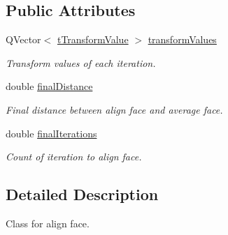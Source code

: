 \subsection*{Public Attributes}
\begin{DoxyCompactItemize}
\item 
\hypertarget{class_face_aligner_a7688c60fe7dde82bf3c6d1e41ec024f0}{Q\+Vector$<$ \hyperlink{structt_transform_value}{t\+Transform\+Value} $>$ \hyperlink{class_face_aligner_a7688c60fe7dde82bf3c6d1e41ec024f0}{transform\+Values}}\label{class_face_aligner_a7688c60fe7dde82bf3c6d1e41ec024f0}

\begin{DoxyCompactList}\small\item\em Transform values of each iteration. \end{DoxyCompactList}\item 
\hypertarget{class_face_aligner_aa0f2d987bb234d2c74bd72d0ce7ecc96}{double \hyperlink{class_face_aligner_aa0f2d987bb234d2c74bd72d0ce7ecc96}{final\+Distance}}\label{class_face_aligner_aa0f2d987bb234d2c74bd72d0ce7ecc96}

\begin{DoxyCompactList}\small\item\em Final distance between align face and average face. \end{DoxyCompactList}\item 
\hypertarget{class_face_aligner_a3b13f838d2c05d1f6a98ae63d6c53c1f}{double \hyperlink{class_face_aligner_a3b13f838d2c05d1f6a98ae63d6c53c1f}{final\+Iterations}}\label{class_face_aligner_a3b13f838d2c05d1f6a98ae63d6c53c1f}

\begin{DoxyCompactList}\small\item\em Count of iteration to align face. \end{DoxyCompactList}\end{DoxyCompactItemize}


\subsection{Detailed Description}
Class for align face. 

